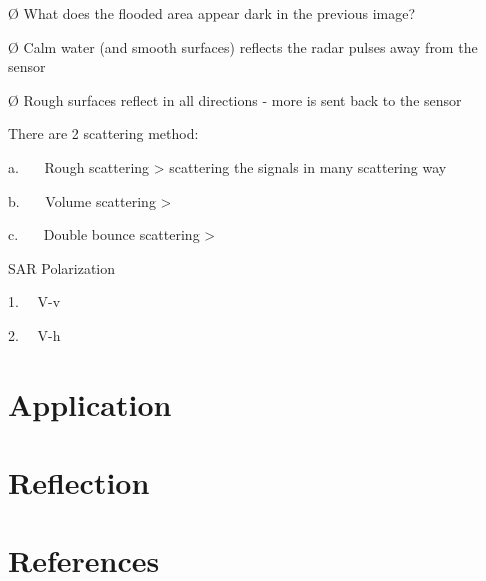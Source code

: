 \documentclass[
  letterpaper,
  DIV=11,
  numbers=noendperiod]{scrreprt}
\begin{document}
Ø What does the flooded area appear dark in the previous image?

Ø Calm water (and smooth surfaces) reflects the radar pulses away from
the sensor

Ø Rough surfaces reflect in all directions - more is sent back to the
sensor

There are 2 scattering method:

a.~~~ Rough scattering \textgreater{} scattering the signals in many
scattering way

b.~~~ Volume scattering \textgreater{}

c.~~~ Double bounce scattering \textgreater{}

SAR Polarization

1.~~ V-v

2.~~ V-h

\hypertarget{application-6}{%
\section{Application}\label{application-6}}

\hypertarget{reflection-5}{%
\section{Reflection}\label{reflection-5}}

\hypertarget{references-5}{%
\section*{References}\label{references-5}}
\end{document}
